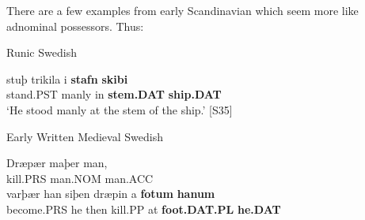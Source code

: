 
There are a few examples from early Scandinavian which seem more like adnominal possessors. Thus:


\item 


\item 

Runic Swedish



 \ea\label{}
\gll stuþ  trikila  i  \textbf{stafn} \textbf{skibi}\\


stand.PST  manly  in  \textbf{stem.DAT} \textbf{ship.DAT}\\

\glt ‘He stood manly at the stem of the ship.’ [S35]

\z

\item 

\label{bkm:Ref95296719}Early Written Medieval Swedish



 \ea\label{}
\gll Dræpær  maþer  man,\\


kill.PRS  man.NOM  man.ACC\\

 \ea\label{}
\gll varþær  han  siþen  dræpin  a  \textbf{fotum} \textbf{hanum}\\


become.PRS  he  then  kill.PP  at  \textbf{foot.DAT.PL} \textbf{he.DAT}\\

